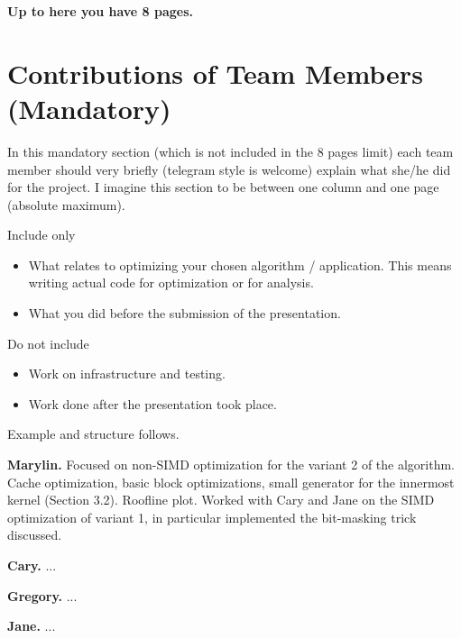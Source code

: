 \documentclass[letterpaper]{article}
\newcommand{\mypar}[1]{{\bf #1.}}
\begin{document}
\bigskip
{\bf Up to here you have 8 pages.}

\section{Contributions of Team Members (Mandatory)}

In this mandatory section (which is not included in the 8 pages limit) each team member should very briefly (telegram style is welcome) explain what she/he did for the project. I imagine this section to be between one column and one page (absolute maximum).

Include only 
\begin{itemize}
	\item What relates to optimizing your chosen algorithm / application. This means writing actual code for optimization or for analysis.
	\item What you did before the submission of the presentation.
\end{itemize}
Do not include
\begin{itemize}
	\item Work on infrastructure and testing.
	\item Work done after the presentation took place.
\end{itemize}

Example and structure follows.

\mypar{Marylin} Focused on non-SIMD optimization for the variant 2 of the algorithm. Cache optimization, basic block optimizations, small generator for the innermost kernel (Section 3.2). Roofline plot. Worked with Cary and Jane on the SIMD optimization of variant 1, in particular implemented the bit-masking trick discussed.

\mypar{Cary} ...

\mypar{Gregory} ...

\mypar{Jane} ...



\end{document}
